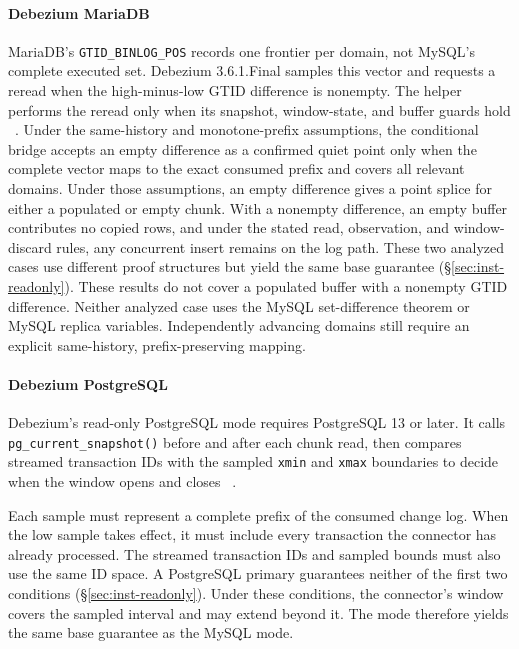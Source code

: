 \documentclass[sigconf,nonacm,10pt]{acmart}
\theoremstyle{plain}
\theoremstyle{definition}
\begin{document}
\begingroup
\RaggedRight
\paragraph{Debezium MariaDB}
MariaDB's \texttt{GTID\_\allowbreak{}BINLOG\_\allowbreak{}POS} records one frontier per domain,
not MySQL's complete executed set. Debezium 3.6.1.Final samples this
vector and requests a reread when the high-minus-low GTID difference
is nonempty. The helper performs the reread only when its snapshot,
window-state, and buffer guards hold
~\cite{debezium_mariadb_connector,debezium_mariadb_readonly_source,debezium_mysql_readonly_source,mariadb_gtid}.
Under the same-history and monotone-prefix assumptions, the 
conditional bridge accepts an empty difference as a confirmed quiet
point only when the complete vector maps to the exact consumed prefix
and covers all relevant domains.
Under those assumptions, an empty difference gives a point splice for
either a populated or empty chunk. With a nonempty difference, an
empty buffer contributes no copied rows, and under the stated read,
observation, and window-discard rules, any concurrent insert remains
on the log path. These two analyzed cases use different proof
structures but yield the same base guarantee (\S\ref{sec:inst-readonly}).
These results do not cover a populated buffer with a nonempty GTID
difference. Neither analyzed case uses the
MySQL set-difference theorem or MySQL replica variables. Independently
advancing domains still require an explicit same-history,
prefix-preserving mapping.

\par\endgroup

\paragraph{Debezium PostgreSQL}
Debezium's read-only PostgreSQL mode requires PostgreSQL 13 or later. It
calls \texttt{pg\_\allowbreak{}current\_\allowbreak{}snapshot()} before
and after each chunk read, then compares streamed transaction IDs with
the sampled \texttt{xmin} and \texttt{xmax} boundaries to decide when the window opens and closes
~\cite{debezium_ddd8,debezium_postgres_readonly_source}.

Each sample must represent a complete prefix of the consumed change
log. When the low sample takes effect, it must include every transaction
the connector has already processed. The streamed transaction IDs and
sampled bounds must also use the same ID space. A PostgreSQL primary
guarantees neither of the first two conditions (\S\ref{sec:inst-readonly}). Under these
conditions, the connector's window covers the sampled interval and may
extend beyond it. The mode therefore yields the same base guarantee as
the MySQL mode.
\end{document}
